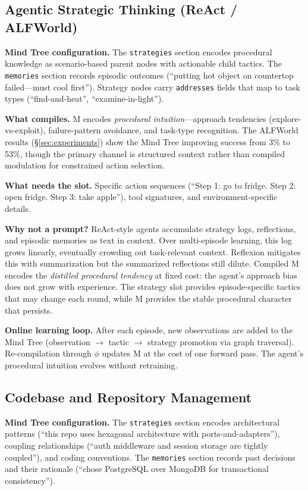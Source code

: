 \subsection{Agentic Strategic Thinking (ReAct / ALFWorld)}

\textbf{Mind Tree configuration.} The \texttt{strategies} section encodes procedural knowledge as scenario-based parent nodes with actionable child tactics. The \texttt{memories} section records episodic outcomes (``putting hot object on countertop failed---must cool first''). Strategy nodes carry \texttt{addresses} fields that map to task types (``find-and-heat'', ``examine-in-light'').

\textbf{What compiles.} M encodes \emph{procedural intuition}---approach tendencies (explore-vs-exploit), failure-pattern avoidance, and task-type recognition. The ALFWorld results (\S\ref{sec:experiments}) show the Mind Tree improving success from 3\% to 53\%, though the primary channel is structured context rather than compiled modulation for constrained action selection.

\textbf{What needs the slot.} Specific action sequences (``Step 1: go to fridge. Step 2: open fridge. Step 3: take apple''), tool signatures, and environment-specific details.

\textbf{Why not a prompt?} ReAct-style agents accumulate strategy logs, reflections, and episodic memories as text in context. Over multi-episode learning, this log grows linearly, eventually crowding out task-relevant context. Reflexion \citep{shinn2023reflexion} mitigates this with summarization but the summarized reflections still dilute. Compiled M encodes the \emph{distilled procedural tendency} at fixed cost: the agent's approach bias does not grow with experience. The strategy slot provides episode-specific tactics that may change each round, while M provides the stable procedural character that persists.

\textbf{Online learning loop.} After each episode, new observations are added to the Mind Tree (observation $\to$ tactic $\to$ strategy promotion via graph traversal). Re-compilation through $\phi$ updates M at the cost of one forward pass. The agent's procedural intuition evolves without retraining.

\subsection{Codebase and Repository Management}

\textbf{Mind Tree configuration.} The \texttt{strategies} section encodes architectural patterns (``this repo uses hexagonal architecture with ports-and-adapters''), coupling relationships (``auth middleware and session storage are tightly coupled''), and coding conventions. The \texttt{memories} section records past decisions and their rationale (``chose PostgreSQL over MongoDB for transactional consistency'').

